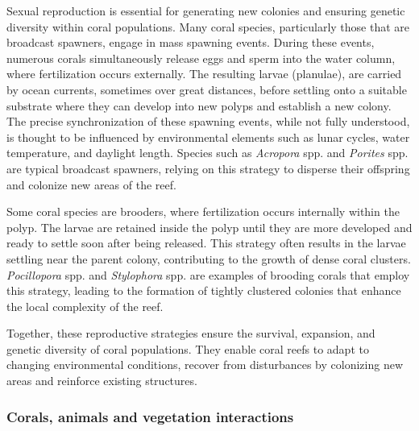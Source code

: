 Sexual reproduction is essential for generating new colonies and ensuring genetic diversity within coral populations. Many coral species, particularly those that are broadcast spawners, engage in mass spawning events. During these events, numerous corals simultaneously release eggs and sperm into the water column, where fertilization occurs externally. The resulting larvae (planulae), are carried by ocean currents, sometimes over great distances, before settling onto a suitable substrate where they can develop into new polyps and establish a new colony. The precise synchronization of these spawning events, while not fully understood, is thought to be influenced by environmental elements such as lunar cycles, water temperature, and daylight length. Species such as \textit{Acropora} spp. and \textit{Porites} spp. are typical broadcast spawners, relying on this strategy to disperse their offspring and colonize new areas of the reef.

Some coral species are brooders, where fertilization occurs internally within the polyp. The larvae are retained inside the polyp until they are more developed and ready to settle soon after being released. This strategy often results in the larvae settling near the parent colony, contributing to the growth of dense coral clusters. \textit{Pocillopora} spp. and \textit{Stylophora} spp. are examples of brooding corals that employ this strategy, leading to the formation of tightly clustered colonies that enhance the local complexity of the reef.

Together, these reproductive strategies ensure the survival, expansion, and genetic diversity of coral populations. They enable coral reefs to adapt to changing environmental conditions, recover from disturbances by colonizing new areas and reinforce existing structures.


\subsubsection{Corals, animals and vegetation interactions}

